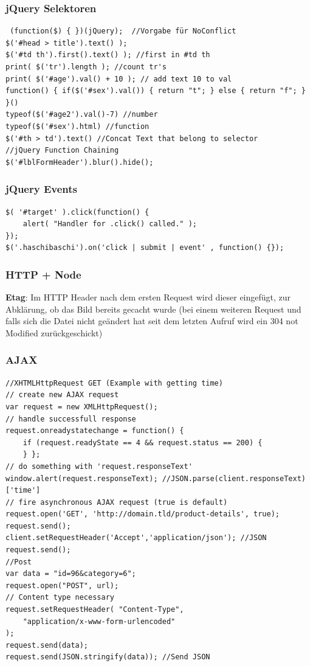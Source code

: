 \begin{multicols*}{4}
\subsubsection{jQuery Selektoren}

 \begin{verbatim}
 (function($) { })(jQuery);  //Vorgabe für NoConflict
$('#head > title').text() );
$('#td th').first().text() ); //first in #td th
print( $('tr').length ); //count tr's
print( $('#age').val() + 10 ); // add text 10 to val
function() { if($('#sex').val()) { return "t"; } else { return "f"; } }()
typeof($('#age2').val()-7) //number
typeof($('#sex').html) //function
$('#th > td').text() //Concat Text that belong to selector
//jQuery Function Chaining
$('#lblFormHeader').blur().hide();
 \end{verbatim}
 
 \subsubsection{jQuery Events}
  \begin{verbatim}
$( '#target' ).click(function() {
    alert( "Handler for .click() called." );
});
$('.haschibaschi').on('click | submit | event' , function() {});
\end{verbatim}

\subsubsection{HTTP + Node}
\textbf{Etag}: Im HTTP Header nach dem ersten Request wird dieser eingefügt, zur 
Abklärung, ob das Bild bereits gecacht wurde 
(bei einem weiteren Request und falls sich die Datei nicht geändert hat seit dem letzten 
Aufruf wird ein 304 not Modified zurückgeschickt)

\subsubsection{AJAX}
\begin{verbatim}
//XHTMLHttpRequest GET (Example with getting time)
// create new AJAX request
var request = new XMLHttpRequest();
// handle successfull response
request.onreadystatechange = function() {
    if (request.readyState == 4 && request.status == 200) {
    } };
// do something with 'request.responseText'
window.alert(request.responseText); //JSON.parse(client.responseText)['time']
// fire asynchronous AJAX request (true is default)
request.open('GET', 'http://domain.tld/product-details', true); 
request.send();
client.setRequestHeader('Accept','application/json'); //JSON
request.send();
//Post
var data = "id=96&category=6";
request.open("POST", url);
// Content type necessary
request.setRequestHeader( "Content-Type",
    "application/x-www-form-urlencoded"
); 
request.send(data);
request.send(JSON.stringify(data)); //Send JSON
 \end{verbatim}
 

\end{multicols*}
